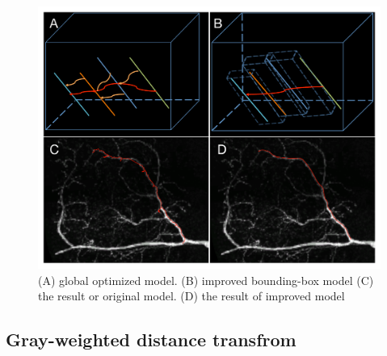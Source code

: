 \begin{figure}[htb]
\begin{center}
\includegraphics[width=5in]{images/fm_dynamic_compare}
\caption{(A) global optimized model. (B) improved bounding-box model (C) the result or original model. (D) the result of improved model}
\label{fig:fm-dynamic-compare}
\end{center}
\end{figure}
\subsection{Gray-weighted distance transfrom}
